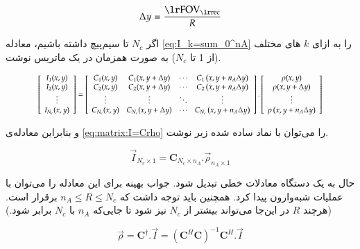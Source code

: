 \removevspace
\begin{equation}
	\Delta y = \dfrac{\lrtext{FOV}_{\lrtext{rec}}}{R}
\end{equation}

اگر $N_c$ تا سیم‌پیچ داشته باشیم، 
معادله \ref{eq:I_k=sum_0^nA}
را به ازای $k$ های مختلف (از 1 تا $N_c$)
به صورت همزمان در یک ماتریس نوشت.


\begin{equation}\label{eq:matrix:I=Crho}
	\rescaleequation{0.85}{
	\left[\begin{array}{c}
		I_1(x, y) \\
		I_2(x, y) \\
		\vdots \\
		I_{N_c}(x, y)
	\end{array}\right]
	=\left[\begin{array}{cccc}
		C_{1}(x, y) & C_{1}(x, y+\Delta y) & \cdots & C_{1}\left(x, y+n_{A} \Delta y\right) \\
		C_{2}(x, y) & C_{2}(x, y+\Delta y) & \cdots & C_{2}\left(x, y+n_{A} \Delta y\right) \\
		\vdots & \vdots & \ddots & \vdots \\
		C_{N_c}(x, y) & C_{N_c}(x, y+\Delta y) & \cdots & C_{N_c}\left(x, y+n_{A} \Delta y\right)
	\end{array}\right]
	.
	\left[\begin{array}{c}
		\rho(x, y) \\
		\rho(x, y+\Delta y) \\
		\vdots \\
		\rho\left(x, y+n_{A} \Delta y\right)
	\end{array}\right]}
\end{equation}

و بنابراین معادله‌ی 
\ref{eq:matrix:I=Crho}
را می‌توان با نماد ساده شده زیر نوشت.
\cite{book:MRIfromPictureToProton}

\removevspace
\begin{equation}
	\vec{I}_{N_c\times1} = \mathbf{C}_{N_c \times n_A} . \vec{\rho}_{n_A\times1}
\end{equation}

حال به یک دستگاه معادلات خطی تبدیل شود. جواب بهینه برای این معادله را می‌توان با عملیات شبه‌وارون
پیدا کرد. همچنین باید توجه داشت که
$n_A \le R \le N_c$
برقرار است.(هرچند $R$ در این‌جا می‌تواند بیشتر از $N_c$ نیز شود تا جایی‌که $n_A$ با $N_c$ برابر شود.)

\removevspace
\begin{equation}\label{eq:rho=CdaggerI}
	\vec{\rho} = \mathbf{C}^\dagger . \vec{I} = (\mathbf{C}^H \mathbf{C})^{-1}\mathbf{C}^H . \vec{I}
\end{equation}



